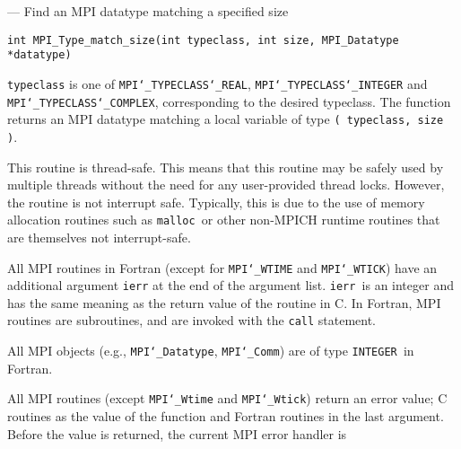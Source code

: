 \startmanpage
{}
--- Find an MPI datatype matching a specified size 
\startvb\begin{verbatim}
int MPI_Type_match_size(int typeclass, int size, MPI_Datatype *datatype)

\end{verbatim}
\endvb

\par
{}
\par
{}
{\tt typeclass} is one of {\tt MPI{\tt \char`\_}TYPECLASS{\tt \char`\_}REAL}, {\tt MPI{\tt \char`\_}TYPECLASS{\tt \char`\_}INTEGER} and
{\tt MPI{\tt \char`\_}TYPECLASS{\tt \char`\_}COMPLEX}, corresponding to the desired typeclass.
The function returns an MPI datatype matching a local variable of type
{\tt ( typeclass, size )}.
\par
{}
\par
This routine is thread-safe.  This means that this routine may be
safely used by multiple threads without the need for any user-provided
thread locks.  However, the routine is not interrupt safe.  Typically,
this is due to the use of memory allocation routines such as {\tt malloc
}or other non-MPICH runtime routines that are themselves not interrupt-safe.
\par
{}
All MPI routines in Fortran (except for {\tt MPI{\tt \char`\_}WTIME} and {\tt MPI{\tt \char`\_}WTICK}) have
an additional argument {\tt ierr} at the end of the argument list.  {\tt ierr
}is an integer and has the same meaning as the return value of the routine
in C.  In Fortran, MPI routines are subroutines, and are invoked with the
{\tt call} statement.
\par
All MPI objects (e.g., {\tt MPI{\tt \char`\_}Datatype}, {\tt MPI{\tt \char`\_}Comm}) are of type {\tt INTEGER
}in Fortran.
\par
{}
\par
All MPI routines (except {\tt MPI{\tt \char`\_}Wtime} and {\tt MPI{\tt \char`\_}Wtick}) return an error value;
C routines as the value of the function and Fortran routines in the last
argument.  Before the value is returned, the current MPI error handler is
